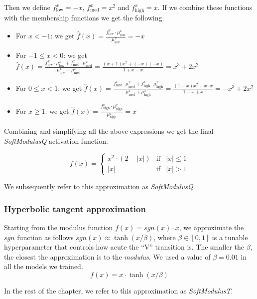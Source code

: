 Then we define $f^x_{\text{low}}=-x$, $f^x_{\text{med}}=x^2$ and $f^x_{\text{high}}=x$. If we combine these functions with the membership functions we get the following.

\begin{itemize}
	\item For $x < -1$: we get $\hat{f}(x)=\frac{f^x_{\text{low}} \cdot \mu^x_{\text{low}}}{\mu^x_{\text{low}}}=-x$

	\item For $-1\leq x < 0$: we get $\hat{f}(x)=\frac{f^x_{\text{low}} \cdot \mu^x_{\text{low}} + f^x_{\text{med}} \cdot \mu^x_{\text{med}}}{\mu^x_{\text{low}} + \mu^x_{\text{med}}}=\frac{(x+1)x^2+(-x)(-x)}{1+x-x}=x^3 + 2x^2$

	\item For $0\leq x < 1$: we get $\hat{f}(x)=\frac{f^x_{\text{med}} \cdot \mu^x_{\text{med}} + f^x_{\text{high}} \cdot \mu^x_{\text{high}}}{\mu^x_{\text{med}} + \mu^x_{\text{high}}}=\frac{(1-x)x^2+x\cdot x}{1-x+x}=-x^3 + 2x^2$

	\item For $x \geq 1$: we get $\hat{f}(x)=\frac{f^x_{\text{high}} \cdot \mu^x_{\text{high}}}{\mu^x_{\text{high}}}=x$
\end{itemize}

Combining and simplifying all the above expressions we get the final \textit{SoftModulusQ} activation function.

$$
f(x)= \left\{ \begin{array}{lcc}
x^2 \cdot (2-|x|) &  \text{if} & |x| \leq 1 \\
|x| &   \text{if}  & |x| > 1
\end{array}
\right.
$$




We  subsequently refer to this approximation as \textit{SoftModulusQ}.

\subsubsection{Hyperbolic tangent approximation}
Starting from the modulus function $f(x)=sgn(x)\cdot x$, we approximate the $sgn$ function as follows $sgn(x) \approx \tanh(x/\beta)$, where $\beta \in [0, 1]$ is a tunable hyperparameter that controls how acute the ``V'' transition is. The smaller the $\beta$, the closest the approximation is to the \textit{modulus}. We used a value of $\beta=0.01$ in all the models we trained.
	$$f(x) = x \cdot \tanh(x/\beta)$$

In the rest of the chapter, we refer to this approximation as \textit{SoftModulusT}.

